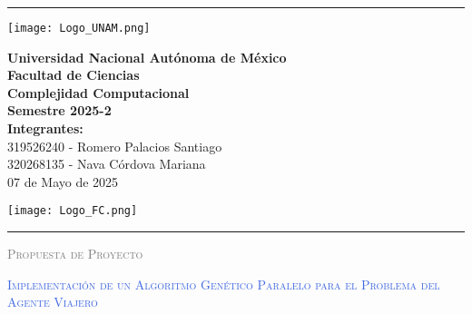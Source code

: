 \documentclass{article}
\renewcommand{\TituloMain}[0]{Propuesta de Proyecto}
\newcommand{\SubtituloMain}[0]{Implementación de un Algoritmo Genético Paralelo para el Problema del Agente Viajero}
\newcommand{\MateriaMain}[0]{Complejidad Computacional}
\newcommand{\FechaMain}[0]{07 de Mayo de 2025}
\begin{document}
    \begin{titlepage}
    \begin{centering}

        \thispagestyle{empty}
        
        \setlength{\parindent}{0cm}
        
        \rule{\linewidth}{0.1mm}
        \begin{center}
            \begin{minipage}{2.5cm}
                \begin{center}
                \texttt{[image: Logo\_UNAM.png]}
                \end{center}
            \end{minipage}\hfill
            \begin{minipage}{10cm}
                \begin{center}
                \textbf{ Universidad Nacional Autónoma de México}\\[0.1cm]
                \textbf{Facultad de Ciencias}\\[0.1cm]
                \textbf{\MateriaMain}\\[0.1cm]
                \textbf{Semestre 2025-2}\\[0.1cm]
                \textbf{Integrantes: }\\[0.1cm]
                319526240 - Romero Palacios Santiago\\[0.1cm]
                320268135 - Nava Córdova Mariana\\[0.1cm]
                \FechaMain
                \end{center}
            \end{minipage}\hfill
            \begin{minipage}{2.5cm}
                \begin{center}
                \texttt{[image: Logo\_FC.png]}
                \end{center}
            \end{minipage}
        \end{center}
        \rule{\linewidth}{0.1mm}
        
        
        
        \date{}
        \vspace{0.5cm}
        \vspace{0.5cm}
            {\scshape\LARGE \textcolor{Gray}{\TituloMain} \par}
            {\scshape\Huge \textcolor{RoyalBlue}{\SubtituloMain} \par}
            {
                \vspace*{2mm}
            }
        \vspace{0.5cm}


\end{centering}
\end{titlepage}
\end{document}

